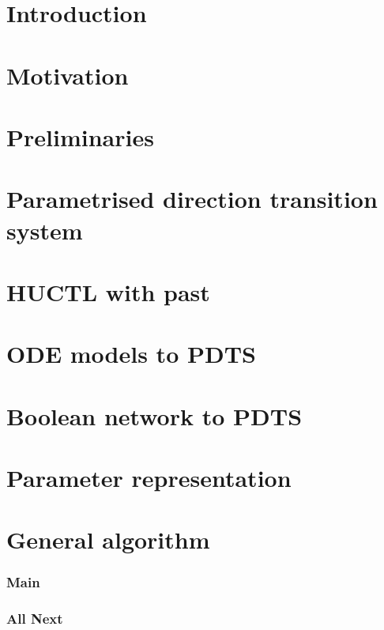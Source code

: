 






\chapter{Introduction}

\chapter{Motivation}

\chapter{Preliminaries}


\chapter{Parametrised direction transition system}

\chapter{HUCTL with past}

\chapter{ODE models to PDTS}

\chapter{Boolean network to PDTS}

\chapter{Parameter representation}

\chapter{General algorithm}
	\subsection{Main}
	\subsection{All Next}
